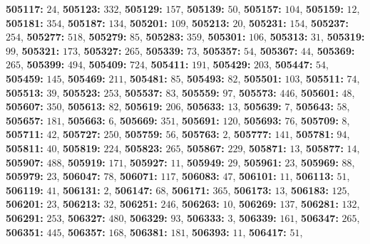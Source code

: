 \textsf{\bfseries 505117:} $24$, \textsf{\bfseries 505123:} $332$, \textsf{\bfseries 505129:} $157$, \textsf{\bfseries 505139:} $50$, \textsf{\bfseries 505157:} $104$, \textsf{\bfseries 505159:} $12$, \textsf{\bfseries 505181:} $354$, \textsf{\bfseries 505187:} $134$, \textsf{\bfseries 505201:} $109$, \textsf{\bfseries 505213:} $20$, \textsf{\bfseries 505231:} $154$, \textsf{\bfseries 505237:} $254$, \textsf{\bfseries 505277:} $518$, \textsf{\bfseries 505279:} $85$, \textsf{\bfseries 505283:} $359$, \textsf{\bfseries 505301:} $106$, \textsf{\bfseries 505313:} $31$, \textsf{\bfseries 505319:} $99$, \textsf{\bfseries 505321:} $173$, \textsf{\bfseries 505327:} $265$, \textsf{\bfseries 505339:} $73$, \textsf{\bfseries 505357:} $54$, \textsf{\bfseries 505367:} $44$, \textsf{\bfseries 505369:} $265$, \textsf{\bfseries 505399:} $494$, \textsf{\bfseries 505409:} $724$, \textsf{\bfseries 505411:} $191$, \textsf{\bfseries 505429:} $203$, \textsf{\bfseries 505447:} $54$, \textsf{\bfseries 505459:} $145$, \textsf{\bfseries 505469:} $211$, \textsf{\bfseries 505481:} $85$, \textsf{\bfseries 505493:} $82$, \textsf{\bfseries 505501:} $103$, \textsf{\bfseries 505511:} $74$, \textsf{\bfseries 505513:} $39$, \textsf{\bfseries 505523:} $253$, \textsf{\bfseries 505537:} $83$, \textsf{\bfseries 505559:} $97$, \textsf{\bfseries 505573:} $446$, \textsf{\bfseries 505601:} $48$, \textsf{\bfseries 505607:} $350$, \textsf{\bfseries 505613:} $82$, \textsf{\bfseries 505619:} $206$, \textsf{\bfseries 505633:} $13$, \textsf{\bfseries 505639:} $7$, \textsf{\bfseries 505643:} $58$, \textsf{\bfseries 505657:} $181$, \textsf{\bfseries 505663:} $6$, \textsf{\bfseries 505669:} $351$, \textsf{\bfseries 505691:} $120$, \textsf{\bfseries 505693:} $76$, \textsf{\bfseries 505709:} $8$, \textsf{\bfseries 505711:} $42$, \textsf{\bfseries 505727:} $250$, \textsf{\bfseries 505759:} $56$, \textsf{\bfseries 505763:} $2$, \textsf{\bfseries 505777:} $141$, \textsf{\bfseries 505781:} $94$, \textsf{\bfseries 505811:} $40$, \textsf{\bfseries 505819:} $224$, \textsf{\bfseries 505823:} $265$, \textsf{\bfseries 505867:} $229$, \textsf{\bfseries 505871:} $13$, \textsf{\bfseries 505877:} $14$, \textsf{\bfseries 505907:} $488$, \textsf{\bfseries 505919:} $171$, \textsf{\bfseries 505927:} $11$, \textsf{\bfseries 505949:} $29$, \textsf{\bfseries 505961:} $23$, \textsf{\bfseries 505969:} $88$, \textsf{\bfseries 505979:} $23$, \textsf{\bfseries 506047:} $78$, \textsf{\bfseries 506071:} $117$, \textsf{\bfseries 506083:} $47$, \textsf{\bfseries 506101:} $11$, \textsf{\bfseries 506113:} $51$, \textsf{\bfseries 506119:} $41$, \textsf{\bfseries 506131:} $2$, \textsf{\bfseries 506147:} $68$, \textsf{\bfseries 506171:} $365$, \textsf{\bfseries 506173:} $13$, \textsf{\bfseries 506183:} $125$, \textsf{\bfseries 506201:} $23$, \textsf{\bfseries 506213:} $32$, \textsf{\bfseries 506251:} $246$, \textsf{\bfseries 506263:} $10$, \textsf{\bfseries 506269:} $137$, \textsf{\bfseries 506281:} $132$, \textsf{\bfseries 506291:} $253$, \textsf{\bfseries 506327:} $480$, \textsf{\bfseries 506329:} $93$, \textsf{\bfseries 506333:} $3$, \textsf{\bfseries 506339:} $161$, \textsf{\bfseries 506347:} $265$, \textsf{\bfseries 506351:} $445$, \textsf{\bfseries 506357:} $168$, \textsf{\bfseries 506381:} $181$, \textsf{\bfseries 506393:} $11$, \textsf{\bfseries 506417:} $51$, 
